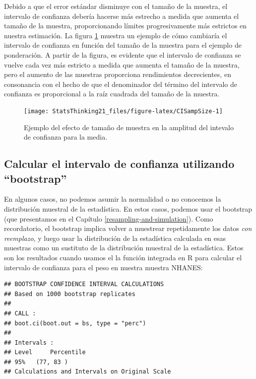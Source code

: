 \documentclass[
  12pt,
]{book}
\begin{document}
Debido a que el error estándar disminuye con el tamaño de la muestra, el intervalo de confianza debería hacerse más estrecho a medida que aumenta el tamaño de la muestra, proporcionando límites progresivamente más estrictos en nuestra estimación. La figura \ref{fig:CISampSize} muestra un ejemplo de cómo cambiaría el intervalo de confianza en función del tamaño de la muestra para el ejemplo de ponderación. A partir de la figura, es evidente que el intervalo de confianza se vuelve cada vez más estricto a medida que aumenta el tamaño de la muestra, pero el aumento de las muestras proporciona rendimientos decrecientes, en consonancia con el hecho de que el denominador del término del intervalo de confianza es proporcional a la raíz cuadrada del tamaño de la muestra.

\begin{figure}
\texttt{[image: StatsThinking21\_files/figure-latex/CISampSize-1]} \caption{Ejemplo del efecto de tamaño de muestra en la amplitud del intevalo de confianza para la media.}\label{fig:CISampSize}
\end{figure}

\hypertarget{calcular-el-intervalo-de-confianza-utilizando-bootstrap}{%
\subsection{Calcular el intervalo de confianza utilizando ``bootstrap''}\label{calcular-el-intervalo-de-confianza-utilizando-bootstrap}}

En algunos casos, no podemos asumir la normalidad o no conocemos la distribución muestral de la estadística. En estos casos, podemos usar el bootstrap (que presentamos en el Capítulo \ref{resampling-and-simulation}). Como recordatorio, el bootstrap implica volver a muestrear repetidamente los datos \emph{con reemplazo}, y luego usar la distribución de la estadística calculada en esas muestras como un sustituto de la distribución muestral de la estadística. Estos son los resultados cuando usamos el la función integrada en R para calcular el intervalo de confianza para el peso en nuestra muestra NHANES:

\begin{verbatim}
## BOOTSTRAP CONFIDENCE INTERVAL CALCULATIONS
## Based on 1000 bootstrap replicates
## 
## CALL : 
## boot.ci(boot.out = bs, type = "perc")
## 
## Intervals : 
## Level     Percentile     
## 95%   (77, 83 )  
## Calculations and Intervals on Original Scale
\end{verbatim}
\end{document}
